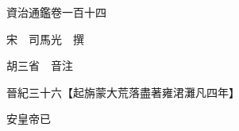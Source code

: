 










 


 
 


 

  
  
  
  
  





  
  
  
  
  
 
  

  

  
  
  



  

 
 

  
   




  

  
  


  　　資治通鑑卷一百十四

　　宋　司馬光　撰

　　胡三省　音注

　　晉紀三十六【起旃蒙大荒落盡著雍涒灘凡四年】

　　安皇帝已

